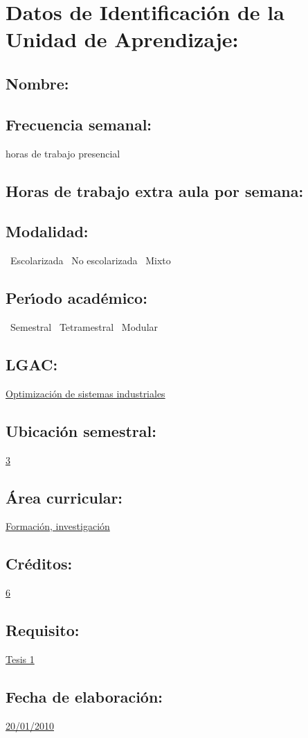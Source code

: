 \documentclass[10 pt]{article}
\begin{document}


\section{Datos de Identificaci\'{o}n de la Unidad de Aprendizaje:}
\subsection{Nombre:} 
\subsection{Frecuencia semanal:} horas de trabajo presencial 
\subsection{Horas de trabajo extra aula por semana:} 
\subsection{Modalidad:} \yes~Escolarizada \no~No escolarizada \no~Mixto
\subsection{Per\'{\i}odo acad\'{e}mico:} \yes~Semestral
\no~Tetramestral \no~Modular
\subsection{LGAC:} \underline{Optimizaci\'{o}n de sistemas industriales}
\subsection{Ubicaci\'{o}n semestral:} \underline{3}
\subsection{\'{A}rea curricular:} \underline{Formaci\'{o}n, investigaci\'{o}n}
\subsection{Cr\'{e}ditos:} \underline{6}
\subsection{Requisito:} \underline{Tesis 1}
\subsection{Fecha de elaboraci\'{o}n:} \underline{20/01/2010}
\end{document}
